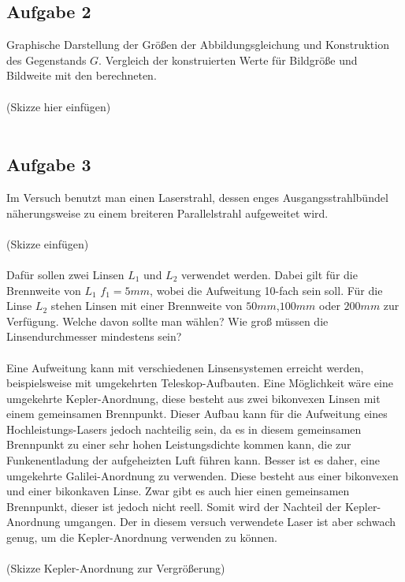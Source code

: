 \documentclass[a4paper,10pt]{scrartcl}
\begin{document}
		\subsection{Aufgabe 2}
			Graphische Darstellung der Größen der Abbildungsgleichung und Konstruktion des Gegenstands \(G\). Vergleich der konstruierten Werte für Bildgröße und Bildweite mit den berechneten.\\
			\\
			(Skizze hier einfügen)\\
			\\
			
		\subsection{Aufgabe 3}
			Im Versuch benutzt man einen Laserstrahl, dessen enges Ausgangsstrahlbündel näherungsweise zu einem breiteren Parallelstrahl aufgeweitet wird.\\
			\\
			(Skizze einfügen)\\
			\\
			Dafür sollen zwei Linsen \(L_{1}\) und \(L_{2}\) verwendet werden. Dabei gilt für die Brennweite von \(L_{1}\) \(f_{1}=5mm\), wobei die  Aufweitung 10-fach sein soll. Für die Linse \(L_{2}\) stehen Linsen mit einer Brennweite von \(50mm\),\(100mm\) oder \(200mm\) zur Verfügung. Welche davon sollte man wählen? Wie groß müssen die Linsendurchmesser mindestens sein?\\
			\\
			Eine Aufweitung kann mit verschiedenen Linsensystemen erreicht werden, beispielsweise mit umgekehrten Teleskop-Aufbauten. Eine Möglichkeit wäre eine umgekehrte Kepler-Anordnung, diese besteht aus zwei bikonvexen Linsen mit einem gemeinsamen Brennpunkt. Dieser Aufbau kann für die Aufweitung eines Hochleistungs-Lasers jedoch nachteilig sein, da es in diesem gemeinsamen Brennpunkt zu einer sehr hohen Leistungsdichte kommen kann, die zur Funkenentladung der aufgeheizten Luft führen kann. Besser ist es daher, eine umgekehrte Galilei-Anordnung zu verwenden. Diese besteht aus einer bikonvexen und einer bikonkaven Linse. Zwar gibt es auch hier einen gemeinsamen Brennpunkt, dieser ist jedoch nicht reell. 
			Somit wird der Nachteil der Kepler-Anordnung umgangen. Der in diesem versuch verwendete Laser ist aber schwach genug, um die Kepler-Anordnung verwenden zu können.\\
			\\
			(Skizze Kepler-Anordnung zur Vergrößerung)\\
\end{document}
